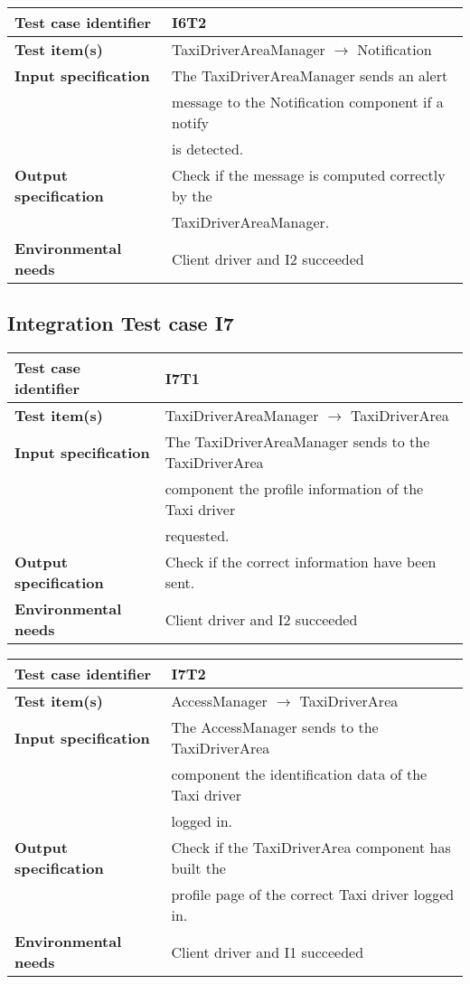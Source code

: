 		\begin{tabular}{ l l}
			\hline 		\textbf{Test case identifier} & I6T2 \\
			\hline		\textbf{Test item(s)} & TaxiDriverAreaManager $\rightarrow$ Notification \\
			\hline		\textbf{Input specification} & The TaxiDriverAreaManager sends an alert \\ & message to the Notification component if a notify \\ & is detected.\\
			\hline		\textbf{Output specification} & Check if the message is computed correctly by the\\ & TaxiDriverAreaManager.\\
			\hline		\textbf{Environmental needs} & Client driver and I2 succeeded\\
			\hline
		\end{tabular}
	\subsection{Integration Test case I7}
		\begin{tabular}{ l l}
			\hline 		\textbf{Test case identifier} & I7T1 \\
			\hline		\textbf{Test item(s)}  & TaxiDriverAreaManager $\rightarrow$ TaxiDriverArea \\
			\hline		\textbf{Input specification} & The TaxiDriverAreaManager sends to the TaxiDriverArea\\ & component the profile information of the Taxi driver\\ & requested.\\
			\hline		\textbf{Output specification} & Check if the correct information have been sent.\\
			\hline		\textbf{Environmental needs} & Client driver and I2 succeeded\\
			\hline
		\end{tabular}
		
		\vspace{1cm}
		
		\begin{tabular}{ l l}
			\hline 		\textbf{Test case identifier} & I7T2 \\
			\hline		\textbf{Test item(s)}  & AccessManager $\rightarrow$ TaxiDriverArea \\
			\hline		\textbf{Input specification} & The AccessManager sends to the TaxiDriverArea \\ & component the identification data of the Taxi driver\\ & logged in.\\
			\hline		\textbf{Output specification} & Check if the TaxiDriverArea component has built the\\ & profile page of the correct Taxi driver logged in.\\
			\hline		\textbf{Environmental needs} & Client driver and I1 succeeded\\
			\hline
		\end{tabular}
